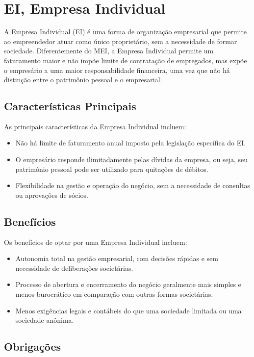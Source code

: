 \section{EI, Empresa Individual}

A Empresa Individual (EI) é uma forma de organização empresarial que permite ao empreendedor atuar como único proprietário, sem a necessidade de formar sociedade. Diferentemente do MEI, a Empresa Individual permite um faturamento maior e não impõe limite de contratação de empregados, mas expõe o empresário a uma maior responsabilidade financeira, uma vez que não há distinção entre o patrimônio pessoal e o empresarial.

\subsection{Características Principais}

As principais características da Empresa Individual incluem:
\begin{itemize}
    \item Não há limite de faturamento anual imposto pela legislação específica do EI.
    \item O empresário responde ilimitadamente pelas dívidas da empresa, ou seja, seu patrimônio pessoal pode ser utilizado para quitações de débitos.
    \item Flexibilidade na gestão e operação do negócio, sem a necessidade de consultas ou aprovações de sócios.
\end{itemize}

\subsection{Benefícios}

Os benefícios de optar por uma Empresa Individual incluem:
\begin{itemize}
    \item Autonomia total na gestão empresarial, com decisões rápidas e sem necessidade de deliberações societárias.
    \item Processo de abertura e encerramento do negócio geralmente mais simples e menos burocrático em comparação com outras formas societárias.
    \item Menos exigências legais e contábeis do que uma sociedade limitada ou uma sociedade anônima.
\end{itemize}

\subsection{Obrigações}

